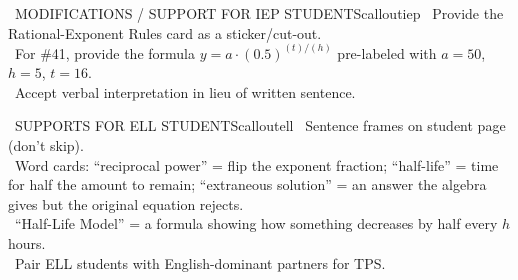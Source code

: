 \documentclass[11pt]{article}
\begin{document}
\begin{callout}{\IconPuzzle\ MODIFICATIONS / SUPPORT FOR IEP STUDENTS}{calloutiep}
\textbullet\ Provide the Rational-Exponent Rules card as a sticker/cut-out.\\
\textbullet\ For \#41, provide the formula \(y = a\cdot(0.5)^{(t)/(h)}\) pre-labeled with \(a=50\), \(h=5\), \(t=16\).\\
\textbullet\ Accept verbal interpretation in lieu of written sentence.
\end{callout}

\begin{callout}{\IconGlobe\ SUPPORTS FOR ELL STUDENTS}{calloutell}
\textbullet\ Sentence frames on student page (don't skip).\\
\textbullet\ Word cards: ``reciprocal power'' = flip the exponent fraction; ``half-life'' = time for half the amount to remain; ``extraneous solution'' = an answer the algebra gives but the original equation rejects.\\
\textbullet\ ``Half-Life Model'' = a formula showing how something decreases by half every \(h\) hours.\\
\textbullet\ Pair ELL students with English-dominant partners for TPS.
\end{callout}
\end{document}
